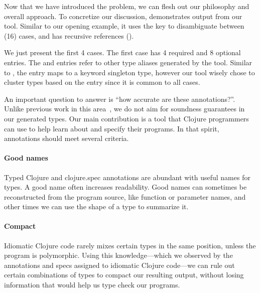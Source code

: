 \label{infer:sec:overview}

%

Now that we have introduced the problem,
we can flesh out our philosophy and overall
approach. To concretize our discussion,
 demonstrates output from our
tool.
Similar to our opening example, it uses the 
key to disambiguate between (16) cases, and has recursive
references ().

We just present the first 4 cases.
The first case  has 4 required
and 8 optional entries.
The  and  entries refer to
other  type aliases generated by the tool.
Similar to ,
the  entry maps to a keyword singleton
type,
however our tool wisely chose to cluster types 
based on the  entry since it is common to all cases.



An important question to answer is ``how accurate are these annotations?''.
Unlike previous work in this area~\cite{An10dynamicinference}, we do not aim for soundness guarantees
in our generated types. 
Our main contribution is a tool that Clojure programmers
can use to help learn about and specify their programs.
In that spirit, annotations should meet several criteria.

\paragraph{Good names}
Typed Clojure and clojure.spec annotations are abundant
with useful names for types. A good name often increases
readability.
Good names can sometimes be reconstructed from the program source,
like function or parameter names, and other times 
we can use the shape of a type to summarize it.

\paragraph{Compact}
Idiomatic Clojure code rarely mixes certain types in the same position,
unless the program is polymorphic. Using this knowledge---which we observed
by the annotations and specs assigned to idiomatic Clojure 
code---we can rule out certain combinations of types to compact our
resulting output, without losing information that would help us
type check our programs.


